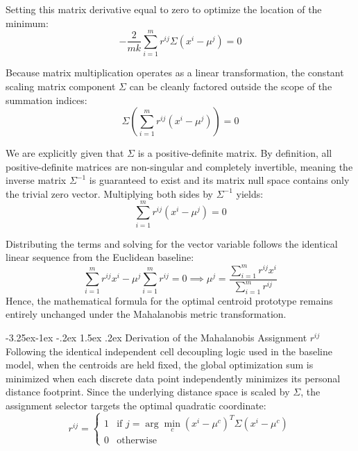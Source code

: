 \documentclass[twoside, 10pt]{article}
\makeatletter
\renewcommand{\paragraph}{\@startsection{paragraph}{4}{\z@}%
    {-3.25ex\@plus -1ex \@minus -.2ex}%
    {1.5ex \@plus .2ex}%
    {\normalfont\normalsize\bfseries}}
\makeatother
\begin{document}
Setting this matrix derivative equal to zero to optimize the location of the minimum:
\begin{equation}
-\frac{2}{mk} \sum_{i=1}^{m} r^{ij} \Sigma (x^i - \mu^j) = 0
\end{equation}

Because matrix multiplication operates as a linear transformation, the constant scaling matrix component $\Sigma$ can be cleanly factored outside the scope of the summation indices:
\begin{equation}
\Sigma \left( \sum_{i=1}^{m} r^{ij} (x^i - \mu^j) \right) = 0
\end{equation}

We are explicitly given that $\Sigma$ is a positive-definite matrix. By definition, all positive-definite matrices are non-singular and completely invertible, meaning the inverse matrix $\Sigma^{-1}$ is guaranteed to exist and its matrix null space contains only the trivial zero vector. Multiplying both sides by $\Sigma^{-1}$ yields:
\begin{equation}
\sum_{i=1}^{m} r^{ij}(x^i - \mu^j) = 0
\end{equation}

Distributing the terms and solving for the vector variable follows the identical linear sequence from the Euclidean baseline:
\begin{equation}
\sum_{i=1}^{m} r^{ij}x^i - \mu^j \sum_{i=1}^{m} r^{ij} = 0 \implies \mu^j = \frac{\sum_{i=1}^{m} r^{ij}x^i}{\sum_{i=1}^{m} r^{ij}}
\end{equation}
Hence, the mathematical formula for the optimal centroid prototype remains entirely unchanged under the Mahalanobis metric transformation.

\paragraph{Derivation of the Mahalanobis Assignment $r^{ij}$}
Following the identical independent cell decoupling logic used in the baseline model, when the centroids are held fixed, the global optimization sum is minimized when each discrete data point independently minimizes its personal distance footprint. Since the underlying distance space is scaled by $\Sigma$, the assignment selector targets the optimal quadratic coordinate:
\begin{equation}
r^{ij} = \begin{cases} 1 & \text{if } j = \arg\min_{c} (x^i - \mu^c)^T \Sigma (x^i - \mu^c) \\ 0 & \text{otherwise} \end{cases}
\end{equation}
\end{document}
